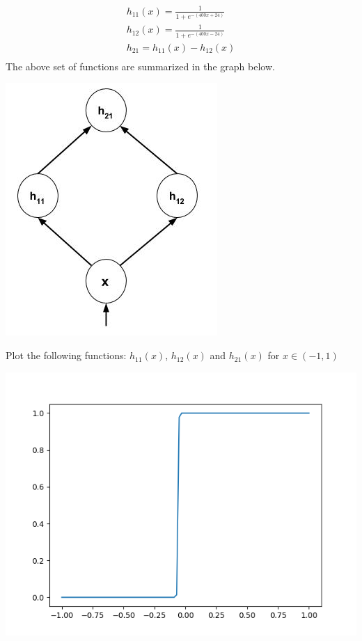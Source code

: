 \documentclass[solution,addpoints,12pt]{exam}
\begin{document}
\begin{questions}
\begin{parts}
                  \begin{align*}
                    h_{11}(x) = \frac{1}{1 + e^{-(400 x + 24)}}  \\
                    h_{12}(x) = \frac{1}{1 + e^{-(400 x - 24)}}  \\
                    h_{21} = h_{11}(x) - h_{12}(x)  \\
                  \end{align*}
                  The above set of functions are summarized in the graph below.
                              	 \begin{center}
            		\includegraphics[scale=0.35]{sig2d}
          		  \end{center}
                  Plot the following functions: $h_{11}(x)$, $h_{12}(x)$ and $h_{21}(x)$ for $x \in (-1, 1)$
                  \begin{solution}
                  		\begin{center}
                  			\includegraphics[scale=0.8]{h11}
                  			\label{fig:h1}
                  		\end{center}
                  		

\end{solution}
\end{parts}
\end{questions}
\end{document}
